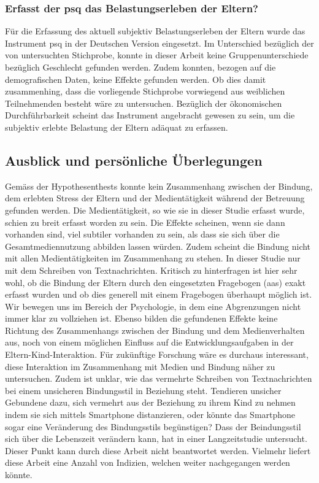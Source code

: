\subsubsection{Erfasst der \acrshort{psq} das Belastungserleben der Eltern?}
Für die Erfassung des aktuell subjektiv Belastungserleben der Eltern wurde das Instrument \acrfull{psq} in der Deutschen Version eingesetzt. Im Unterschied bezüglich der von  untersuchten Stichprobe, konnte in dieser Arbeit keine Gruppenunterschiede bezüglich Geschlecht gefunden werden. Zudem konnten, bezogen auf die demografischen Daten, keine Effekte gefunden werden. Ob dies damit zusammenhing, dass die vorliegende Stichprobe vorwiegend aus weiblichen Teilnehmenden besteht wäre zu untersuchen. Bezüglich der ökonomischen Durchführbarkeit scheint das Instrument angebracht gewesen zu sein, um die subjektiv erlebte Belastung der Eltern adäquat zu erfassen.

\subsection{Ausblick und persönliche Überlegungen} \label{sec:Ausblick}
Gemäss der Hypothesenthests konnte kein Zusammenhang zwischen der Bindung, dem erlebten Stress der Eltern und der Medientätigkeit während der Betreuung gefunden werden. Die Medientätigkeit, so wie sie in dieser Studie erfasst wurde, schien zu breit erfasst worden zu sein. Die Effekte scheinen, wenn sie dann vorhanden sind, viel subtiler vorhanden zu sein, als dass sie sich über die Gesamtmediennutzung abbilden lassen würden. Zudem scheint die Bindung nicht mit allen Medientätigkeiten im Zusammenhang zu stehen. In dieser Studie nur mit dem Schreiben von Textnachrichten. Kritisch zu hinterfragen ist hier sehr wohl, ob die Bindung der Eltern durch den eingesetzten Fragebogen (\acrshort{aas}) exakt erfasst wurden und ob dies generell mit einem Fragebogen überhaupt möglich ist. Wir bewegen uns im Bereich der Psychologie, in dem eine Abgrenzungen nicht immer klar zu vollziehen ist. Ebenso bilden die gefundenen Effekte keine Richtung des Zusammenhangs zwischen der Bindung und dem Medienverhalten aus, noch von einem möglichen Einfluss auf die Entwicklungsaufgaben in der Eltern-Kind-Interaktion. Für zukünftige Forschung wäre es durchaus interessant, diese Interaktion im Zusammenhang mit Medien und Bindung näher zu untersuchen. Zudem ist unklar, wie das vermehrte Schreiben von Textnachrichten bei einem unsicheren Bindungsstil in Beziehung steht. Tendieren unsicher Gebundene dazu, sich vermehrt aus der Beziehung zu ihrem Kind zu nehmen indem sie sich mittels Smartphone distanzieren, oder könnte das Smartphone sogar eine Veränderung des Bindungsstils begünstigen? Dass der Beindungsstil sich über die Lebenszeit verändern kann, hat  in einer Langzeitstudie untersucht. Dieser Punkt kann durch diese Arbeit nicht beantwortet werden. Vielmehr liefert diese Arbeit eine Anzahl von Indizien, welchen weiter nachgegangen werden könnte.

